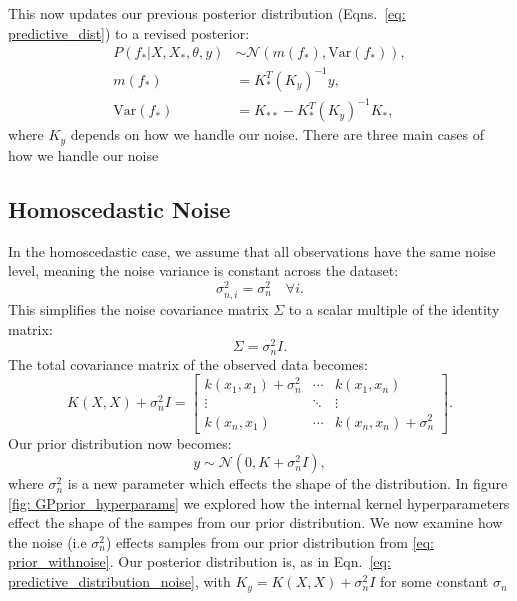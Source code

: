 \documentclass{ucdgradtaughtthesis}
\begin{document}
This now updates our previous posterior distribution (Eqns.~\eqref{eq: predictive_dist}) to a revised posterior:
%
\begin{subequations}
\begin{align}
    P(f_*|X,X_*,\theta,y) &\sim \mathcal{N}(m(f_*), \text{Var}(f_*)),\\
m(f_*) &= K_*^T (K_y)^{-1} y,
\label{eq: predictive_mean_noise}\\
\text{Var}(f_*) &= K_{**} - K_*^T (K_y)^{-1} K_*,
\label{eq: predictive_variance_noise}
\end{align}
\label{eq: predictive_distribution_noise}
\end{subequations}
%
where \(K_y\) depends on how we handle our noise. There are three main cases of how we handle our noise

\subsection{Homoscedastic Noise} 

In the homoscedastic case, we assume that all observations have the same noise level, meaning the noise variance is constant across the dataset:
\[
\sigma_{n,i}^2 = \sigma_n^2 \quad \forall i.
\]
This simplifies the noise covariance matrix \( \Sigma \) to a scalar multiple of the identity matrix:
\[
\Sigma = \sigma_n^2 I.
\]
The total covariance matrix of the observed data becomes:
\[
K(X, X) + \sigma_n^2 I = 
\begin{bmatrix}
k(x_1, x_1) + \sigma_n^2 & \cdots & k(x_1, x_n) \\
\vdots & \ddots & \vdots \\
k(x_n, x_1) & \cdots & k(x_n, x_n) + \sigma_n^2
\end{bmatrix}.
\]
Our prior distribution now becomes:
\begin{equation}
y \sim \mathcal{N}(0, K+\sigma_n^2 I),
\label{eq: prior_withnoise}
\end{equation}
where $\sigma_n^2$ is a new parameter which effects the shape of the distribution. In figure \ref{fig: GPprior_hyperparams} we 
explored how the internal kernel hyperparameters effect the shape of the sampes from our prior distribution. 
We now examine how the noise (i.e $\sigma_n^2$) effects samples from our prior distribution from \ref{eq: prior_withnoise}.
Our posterior distribution is, as in Eqn.~\eqref{eq:  predictive_distribution_noise}, with \(K_y = K(X, X) + \sigma_n^2 I \) for some constant \(\sigma_n\)
\end{document}
